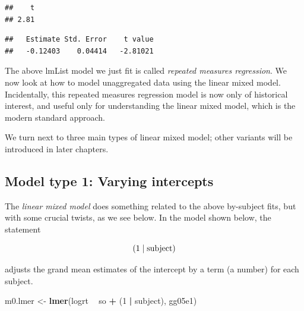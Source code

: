 \documentclass[12pt,]{krantz}
\newenvironment{Shaded}{\begin{snugshade}}{\end{snugshade}}
\newcommand{\CommentTok}[1]{\textcolor[rgb]{0.56,0.35,0.01}{\textit{#1}}}
\newcommand{\DecValTok}[1]{\textcolor[rgb]{0.00,0.00,0.81}{#1}}
\newcommand{\KeywordTok}[1]{\textcolor[rgb]{0.13,0.29,0.53}{\textbf{#1}}}
\newcommand{\NormalTok}[1]{#1}
\newcommand{\OperatorTok}[1]{\textcolor[rgb]{0.81,0.36,0.00}{\textbf{#1}}}
\newcommand{\StringTok}[1]{\textcolor[rgb]{0.31,0.60,0.02}{#1}}
\begin{document}
\begin{verbatim}
##    t 
## 2.81
\end{verbatim}

\begin{Shaded}
\end{Shaded}

\begin{verbatim}
##   Estimate Std. Error    t value 
##   -0.12403    0.04414   -2.81021
\end{verbatim}

The above lmList model we just fit is called \emph{repeated measures regression}. We now look at how to model unaggregated data using the linear mixed model. Incidentally, this repeated measures regression model is now only of historical interest, and useful only for understanding the linear mixed model, which is the modern standard approach.

We turn next to three main types of linear mixed model; other variants will be introduced in later chapters.

\hypertarget{model-type-1-varying-intercepts}{%
\subsection{Model type 1: Varying intercepts}\label{model-type-1-varying-intercepts}}

The \emph{linear mixed model} does something related to the above by-subject fits, but with some crucial twists, as we see below.
In the model shown below, the statement

\begin{equation}
(1 \mid \hbox{subject}) 
\end{equation}

adjusts the grand mean estimates of the intercept by a term (a number) for each subject.

\begin{Shaded}
\begin{Highlighting}[]
\NormalTok{m0.lmer <-}\StringTok{ }\KeywordTok{lmer}\NormalTok{(logrt }\OperatorTok{~}\StringTok{ }\NormalTok{so }\OperatorTok{+}\StringTok{ }\NormalTok{(}\DecValTok{1} \OperatorTok{|}\StringTok{ }\NormalTok{subject), }
\NormalTok{  gg05e1)}
\end{Highlighting}
\end{Shaded}
\end{document}
